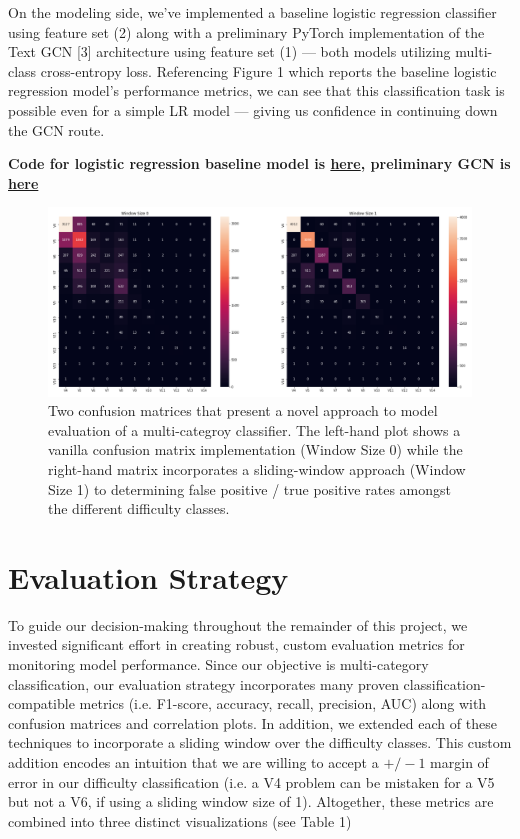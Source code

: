 \documentclass{article}
\begin{document}
On the modeling side, we've implemented a baseline logistic regression classifier using feature set (2) along with a preliminary PyTorch implementation of the Text GCN [3] architecture using feature set (1) --- both models utilizing multi-class cross-entropy loss. Referencing Figure 1 which reports the baseline logistic regression model's performance metrics, we can see that this classification task is possible even for a simple LR model --- giving us confidence in continuing down the GCN route.

{\small\textbf{Code for logistic regression baseline model is \href{https://github.com/gestalt-howard/moonGen/tree/master/howard/models_baseline}{here}, preliminary GCN is \href{https://github.com/gestalt-howard/moonGen/tree/master/aaron/v0.0/scripts}{here}}}

\begin{figure}
\centering
\includegraphics[width=.8\linewidth]{confusion_window}
\caption{Two confusion matrices that present a novel approach to model evaluation of a multi-categroy classifier. The left-hand plot shows a vanilla confusion matrix implementation (Window Size 0) while the right-hand matrix incorporates a sliding-window approach (Window Size 1) to determining false positive / true positive rates amongst the different difficulty classes.}
\end{figure}

\section{Evaluation Strategy}
To guide our decision-making throughout the remainder of this project, we invested significant effort in creating robust, custom evaluation metrics for monitoring model performance. Since our objective is multi-category classification, our evaluation strategy incorporates many proven classification-compatible metrics (i.e. F1-score, accuracy, recall, precision, AUC) along with confusion matrices and correlation plots. In addition, we extended each of these techniques to incorporate a sliding window over the difficulty classes. This custom addition encodes an intuition that we are willing to accept a \(+/- 1\) margin of error in our difficulty classification (i.e. a V4 problem can be mistaken for a V5 but not a V6, if using a sliding window size of 1). Altogether, these metrics are combined into three distinct visualizations (see Table 1) 
\end{document}
